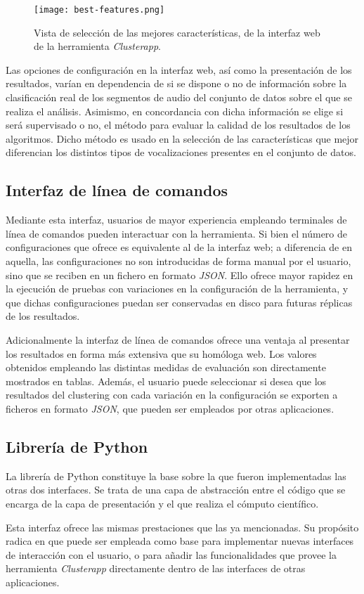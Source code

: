 \begin{figure}[!h]
    \centering
    \texttt{[image: best-features.png]}
    \caption{Vista de selección de las mejores características, de la interfaz web de la herramienta \textit{Clusterapp}.}
    \label{img:best-features}
\end{figure}

Las opciones de configuración en la interfaz web, así como la presentación de los resultados, varían en dependencia de si se dispone o no de información sobre la clasificación real de los segmentos de audio del conjunto de datos sobre el que se realiza el análisis.
Asimismo, en concordancia con dicha información se elige si será supervisado o no, el método para evaluar la calidad de los resultados de los algoritmos.
Dicho método es usado en la selección de las características que mejor diferencian los distintos tipos de vocalizaciones presentes en el conjunto de datos.

\subsection{Interfaz de línea de comandos}\label{subsec:CLI}

Mediante esta interfaz, usuarios de mayor experiencia empleando terminales de línea de comandos pueden interactuar con la herramienta.
Si bien el número de configuraciones que ofrece es equivalente al de la interfaz web;
a diferencia de en aquella, las configuraciones no son introducidas de forma manual por el usuario, sino que se reciben en un fichero en formato \textit{JSON}.
Ello ofrece mayor rapidez en la ejecución de pruebas con variaciones en la configuración de la herramienta, y que dichas configuraciones puedan ser conservadas en disco para futuras réplicas de los resultados.

Adicionalmente la interfaz de línea de comandos ofrece una ventaja al presentar los resultados en forma más extensiva que su homóloga web.
Los valores obtenidos empleando las distintas medidas de evaluación son directamente mostrados en tablas.
Además, el usuario puede seleccionar si desea que los resultados del clustering con cada variación en la configuración se exporten a ficheros en formato \textit{JSON}, que pueden ser empleados por otras aplicaciones.

\subsection{Librería de Python}\label{subsec:libreríaDePython}

La librería de Python constituye la base sobre la que fueron implementadas las otras dos interfaces.
Se trata de una capa de abstracción entre el código que se encarga de la capa de presentación y el que realiza el cómputo científico.

Esta interfaz ofrece las mismas prestaciones que las ya mencionadas.
Su propósito radica en que puede ser empleada como base para implementar nuevas interfaces de interacción con el usuario, o para añadir las funcionalidades que provee la herramienta \textit{Clusterapp} directamente dentro de las interfaces de otras aplicaciones.